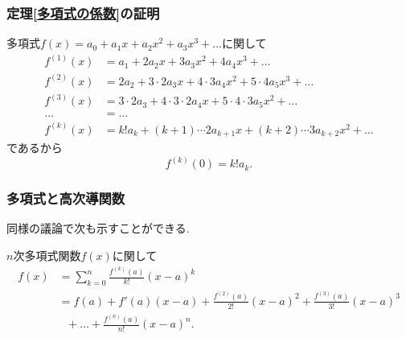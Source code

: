 \begin{frame}
\frametitle{定理\ref{多項式の係数}の証明}


多項式$f(x)=a_0+a_1x+a_2x^2+a_3x^3+\dots$に関して
\begin{align*}
f^{(1)}(x) &=a_1+2a_2x+3a_3x^2+4a_4x^3+\dots \\
f^{(2)}(x) &=2a_2+3\cdot 2 a_3x+4\cdot 3 a_4x^2+5\cdot 4 a_5 x^3+\dots \\
f^{(3)}(x) &=3\cdot 2 a_3+4\cdot 3 \cdot 2 a_4x+5\cdot 4 \cdot 3 a_5 x^2+\dots \\
\dots & = \dots \\ 
f^{(k)}(x) &= k! a_k +(k+1)\cdots 2a_{k+1}x+(k+2)\cdots 3a_{k+2}x^2+\dots
\end{align*}
であるから
$$
f^{(k)}(0)=k! a_k.  
$$

\end{frame}








\begin{frame}
\frametitle{多項式と高次導関数}

同様の議論で次も示すことができる. 

\begin{Thm} \label{poly_exp}
$n$次多項式関数$f(x)$に関して
\begin{align*}
f(x) & = \sum_{k=0}^n\frac{f^{(k)}(a)}{k!}(x-a)^k \\
& =  f(a)+ f'(a)(x-a) + \frac{f^{(2)}(a)}{2!}(x-a)^2  + \frac{f^{(3)}(a)}{3!}(x-a)^3 \\
& \ \ \ + \dots + \frac{f^{(n)}(a)}{n!}(x-a)^n. 
\end{align*}
\end{Thm}


\end{frame}







